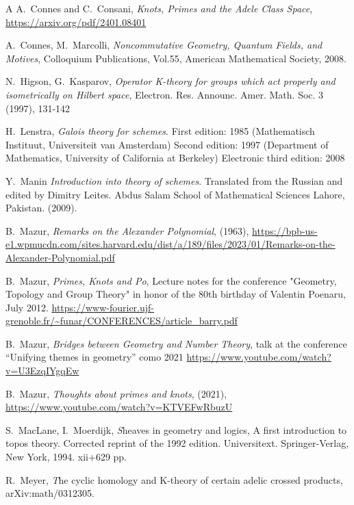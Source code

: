 \documentclass[letterpaper,11pt]{article}
\theoremstyle{plain}
\begin{document}
\begin{thebibliography}{A}
 A.~Connes and C.~Consani, {\em Knots, Primes and the Adele Class Space}, \url{https://arxiv.org/pdf/2401.08401}



 A.~Connes, M.~Marcolli,  \emph{  Noncommutative Geometry, Quantum Fields, and Motives}, Colloquium Publications, Vol.55, American Mathematical Society, 2008.

   N.~Higson, G.~Kasparov, \emph{ Operator K-theory for groups which act properly and isometrically on Hilbert space}, Electron. Res. Announc. Amer. Math. Soc. 3 (1997), 131-142

 H.~Lenstra, {\em Galois theory for schemes}. First edition: 1985
(Mathematisch Instituut, Universiteit van Amsterdam)
Second edition: 1997
(Department of Mathematics, University of California at Berkeley)
Electronic third edition: 2008






 Y.~Manin {\em Introduction into theory of schemes}. Translated from the Russian and edited by Dimitry Leites. Abdus Salam School of Mathematical Sciences Lahore, Pakistan. (2009).

  B.~Mazur, {\em Remarks on the Alexander Polynomial}, (1963), \url{https://bpb-us-e1.wpmucdn.com/sites.harvard.edu/dist/a/189/files/2023/01/Remarks-on-the-Alexander-Polynomial.pdf}

  B.~Mazur, {\em Primes, Knots and Po}, Lecture notes for the conference "Geometry, Topology and Group Theory" in honor of the 80th birthday of Valentin Poenaru, July 2012. \url{https://www-fourier.ujf-grenoble.fr/~funar/CONFERENCES/article_barry.pdf}

  B.~Mazur, {\em Bridges between Geometry and Number Theory},  talk at the conference ``Unifying themes in geometry'' como 2021 \url{https://www.youtube.com/watch?v=U3EzqIYgqEw}

  B.~Mazur, {\em Thoughts about primes and knots},  (2021),  \url{https://www.youtube.com/watch?v=KTVEFwRbuzU}

 S.~MacLane, I.~Moerdijk, {\emph Sheaves in geometry and logics}, A first introduction to topos theory. Corrected reprint of the 1992 edition. Universitext. Springer-Verlag, New York, 1994. xii+629 pp.


 R.~Meyer,  {\emph The cyclic homology and K-theory of certain adelic crossed products},  arXiv:math/0312305.


\end{thebibliography}
\end{document}
